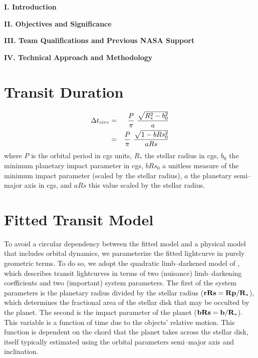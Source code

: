 \centerline{\bf I. Introduction}
\smallskip


\bigskip
\centerline{\bf II. Objectives and Significance}
\smallskip

\bigskip
\centerline{\bf III. Team Qualifications and Previous NASA Support}
\smallskip

\bigskip
\centerline{\bf IV. Technical Approach and Methodology}
\smallskip

\section{Transit Duration}

\begin{eqnarray}
\Delta t_{circ} & = & {{P}\over{\pi}}~{{\sqrt{R_*^2 - b_0^2}}\over{a}} \nonumber \\
                & = & {{P}\over{\pi}}~{{\sqrt{1 - bRs_0^2}}\over{aRs}}
\label{eq-tcirc}
\end{eqnarray}
where $P$ is the orbital period in cgs units, $R_*$ the stellar radius
in cgs, $b_0$ the minimum planetary impact parameter in cgs, $bRs_0$ a
unitless measure of the minimum impact parameter (scaled by the stellar
radius), $a$ the planetary semi--major axis in cgs, and $aRs$ this
value scaled by the stellar radius.

\section{Fitted Transit Model}
To avoid a circular dependency between the fitted model and a physical
model that includes orbital dynamics, we parameterize the fitted
lightcurve in purely geometric terms.  To do so, we adopt the
quadratic limb--darkened model of \cite{2002ApJ...580L.171M}, which
describes transit lightcurves in terms of two (nuisance)
limb--darkening coefficients and two (important) system parameters.
The first of the system parameters is the planetary radius divided by
the stellar radius (${\bf rRs = Rp/R_*}$), which determines the
fractional area of the stellar disk that may be occulted by the
planet.  The second is the impact parameter of the planet (${\bf bRs =
  b/R_*}$).  This variable is a function of time due to the objects'
relative motion.  This function is dependent on the chord that the
planet takes across the stellar disk, itself typically estimated using
the orbital parameters semi--major axis and inclination.  

